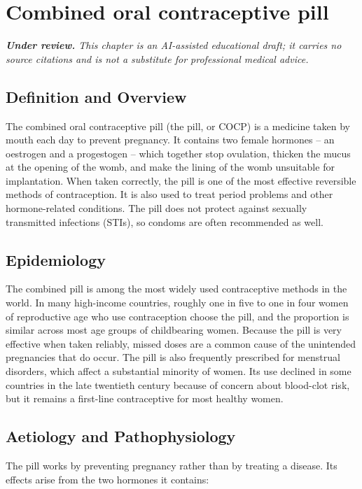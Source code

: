 \chapter{Combined oral contraceptive pill}

\medskip
\noindent\textit{\textbf{Under review.} This chapter is an AI-assisted educational draft; it carries no source citations and is not a substitute for professional medical advice.}

\section*{Definition and Overview}
The combined oral contraceptive pill (the pill, or COCP) is a medicine taken by mouth each day to prevent pregnancy. It contains two female hormones -- an oestrogen and a progestogen -- which together stop ovulation, thicken the mucus at the opening of the womb, and make the lining of the womb unsuitable for implantation. When taken correctly, the pill is one of the most effective reversible methods of contraception. It is also used to treat period problems and other hormone-related conditions. The pill does not protect against sexually transmitted infections (STIs), so condoms are often recommended as well.

\section*{Epidemiology}
The combined pill is among the most widely used contraceptive methods in the world. In many high-income countries, roughly one in five to one in four women of reproductive age who use contraception choose the pill, and the proportion is similar across most age groups of childbearing women. Because the pill is very effective when taken reliably, missed doses are a common cause of the unintended pregnancies that do occur. The pill is also frequently prescribed for menstrual disorders, which affect a substantial minority of women. Its use declined in some countries in the late twentieth century because of concern about blood-clot risk, but it remains a first-line contraceptive for most healthy women.

\section*{Aetiology and Pathophysiology}
The pill works by preventing pregnancy rather than by treating a disease. Its effects arise from the two hormones it contains:

